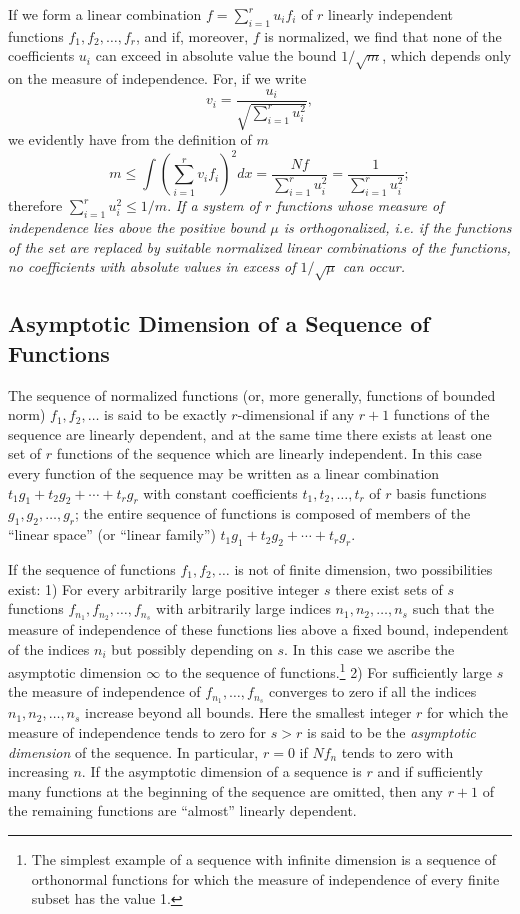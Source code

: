 If we form a linear combination $f=\sum_{i=1}^{r}u_if_i$ of $r$ linearly independent functions $f_1,f_2,\ldots,f_r$, and if, moreover, $f$ is normalized, we find that none of the coefficients $u_i$ can exceed in absolute value the bound $1/\sqrt m$, which depends only on the measure of independence. For, if we write
\[
v_i=\frac{u_i}{\sqrt{\sum_{i=1}^{r}u_i^2}},
\]
we evidently have from the definition of $m$
\[
m\le\int\left(\sum_{i=1}^{r}v_if_i\right)^2dx
=\frac{Nf}{\sum_{i=1}^{r}u_i^2}
=\frac1{\sum_{i=1}^{r}u_i^2};
\]
therefore $\sum_{i=1}^{r}u_i^2\le1/m$. \emph{If a system of $r$ functions whose measure of independence lies above the positive bound $\mu$ is orthogonalized, i.e. if the functions of the set are replaced by suitable normalized linear combinations of the functions, no coefficients with absolute values in excess of $1/\sqrt\mu$ can occur.}

\subsection{Asymptotic Dimension of a Sequence of Functions}
The sequence of normalized functions (or, more generally, functions of bounded norm) $f_1,f_2,\ldots$ is said to be exactly $r$-dimensional if any $r+1$ functions of the sequence are linearly dependent, and at the same time there exists at least one set of $r$ functions of the sequence which are linearly independent. In this case every function of the sequence may be written as a linear combination $t_1g_1+t_2g_2+\cdots+t_rg_r$ with constant coefficients $t_1,t_2,\ldots,t_r$ of $r$ basis functions $g_1,g_2,\ldots,g_r$; the entire sequence of functions is composed of members of the ``linear space'' (or ``linear family'') $t_1g_1+t_2g_2+\cdots+t_rg_r$.

If the sequence of functions $f_1,f_2,\ldots$ is not of finite dimension, two possibilities exist: 1) For every arbitrarily large positive integer $s$ there exist sets of $s$ functions $f_{n_1},f_{n_2},\ldots,f_{n_s}$ with arbitrarily large indices $n_1,n_2,\ldots,n_s$ such that the measure of independence of these functions lies above a fixed bound, independent of the indices $n_i$ but possibly depending on $s$. In this case we ascribe the asymptotic dimension $\infty$ to the sequence of functions.\footnote{The simplest example of a sequence with infinite dimension is a sequence of orthonormal functions for which the measure of independence of every finite subset has the value 1.} 2) For sufficiently large $s$ the measure of independence of $f_{n_1},\ldots,f_{n_s}$ converges to zero if all the indices $n_1,n_2,\ldots,n_s$ increase beyond all bounds. Here the smallest integer $r$ for which the measure of independence tends to zero for $s>r$ is said to be the \emph{asymptotic dimension} of the sequence. In particular, $r=0$ if $Nf_n$ tends to zero with increasing $n$. If the asymptotic dimension of a sequence is $r$ and if sufficiently many functions at the beginning of the sequence are omitted, then any $r+1$ of the remaining functions are ``almost'' linearly dependent.

